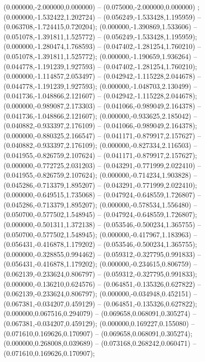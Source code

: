  (0.000000,-2.000000,0.000000) -- (0.075000,-2.000000,0.000000) ;
 (0.000000,-1.532422,1.202724) -- (0.056249,-1.533428,1.195959) -- (0.063708,-1.724415,0.720204);
 (0.000000,-1.390869,1.533606) -- (0.051078,-1.391811,1.525772) -- (0.056249,-1.533428,1.195959);
 (0.000000,-1.280474,1.768593) -- (0.047402,-1.281254,1.760210) -- (0.051078,-1.391811,1.525772);
 (0.000000,-1.190659,1.936264) -- (0.044778,-1.191239,1.927593) -- (0.047402,-1.281254,1.760210);
 (0.000000,-1.114857,2.053497) -- (0.042942,-1.115228,2.044678) -- (0.044778,-1.191239,1.927593);
 (0.000000,-1.048703,2.130499) -- (0.041736,-1.048866,2.121607) -- (0.042942,-1.115228,2.044678);
 (0.000000,-0.989087,2.173303) -- (0.041066,-0.989049,2.164378) -- (0.041736,-1.048866,2.121607);
 (0.000000,-0.933625,2.185042) -- (0.040882,-0.933397,2.176109) -- (0.041066,-0.989049,2.164378);
 (0.000000,-0.880325,2.166547) -- (0.041171,-0.879917,2.157627) -- (0.040882,-0.933397,2.176109);
 (0.000000,-0.827334,2.116503) -- (0.041955,-0.826759,2.107624) -- (0.041171,-0.879917,2.157627);
 (0.000000,-0.772725,2.031203) -- (0.043291,-0.771999,2.022410) -- (0.041955,-0.826759,2.107624);
 (0.000000,-0.714234,1.903828) -- (0.045286,-0.713379,1.895207) -- (0.043291,-0.771999,2.022410);
 (0.000000,-0.649515,1.735068) -- (0.047924,-0.648559,1.726807) -- (0.045286,-0.713379,1.895207);
 (0.000000,-0.578534,1.556480) -- (0.050700,-0.577502,1.548945) -- (0.047924,-0.648559,1.726807);
 (0.000000,-0.501311,1.372138) -- (0.053546,-0.500234,1.365755) -- (0.050700,-0.577502,1.548945);
 (0.000000,-0.417967,1.183963) -- (0.056431,-0.416878,1.179202) -- (0.053546,-0.500234,1.365755);
 (0.000000,-0.328855,0.994462) -- (0.059312,-0.327795,0.991833) -- (0.056431,-0.416878,1.179202);
 (0.000000,-0.234615,0.806759) -- (0.062139,-0.233624,0.806797) -- (0.059312,-0.327795,0.991833);
 (0.000000,-0.136210,0.624576) -- (0.064851,-0.135326,0.627822) -- (0.062139,-0.233624,0.806797);
 (0.000000,-0.034948,0.452151) -- (0.067381,-0.034207,0.459129) -- (0.064851,-0.135326,0.627822);
 (0.000000,0.067516,0.294079) -- (0.069658,0.068091,0.305274) -- (0.067381,-0.034207,0.459129);
 (0.000000,0.169227,0.155080) -- (0.071610,0.169626,0.170907) -- (0.069658,0.068091,0.305274);
 (0.000000,0.268008,0.039689) -- (0.073168,0.268242,0.060471) -- (0.071610,0.169626,0.170907);

